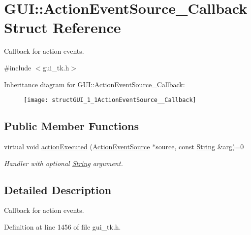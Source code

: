 \hypertarget{structGUI_1_1ActionEventSource__Callback}{\section{G\-U\-I\-:\-:Action\-Event\-Source\-\_\-\-Callback Struct Reference}
\label{structGUI_1_1ActionEventSource__Callback}
}


Callback for action events.  




{\ttfamily \#include $<$gui\-\_\-tk.\-h$>$}

Inheritance diagram for G\-U\-I\-:\-:Action\-Event\-Source\-\_\-\-Callback\-:\begin{figure}[H]
\begin{center}
\leavevmode
\texttt{[image: structGUI\_1\_1ActionEventSource\_\_Callback]}
\end{center}
\end{figure}
\subsection*{Public Member Functions}
\begin{DoxyCompactItemize}
\item 
virtual void \hyperlink{structGUI_1_1ActionEventSource__Callback_a36df23a424558a83b45e3e3d5c175cf2}{action\-Executed} (\hyperlink{classGUI_1_1ActionEventSource}{Action\-Event\-Source} $\ast$source, const \hyperlink{classGUI_1_1String}{String} \&arg)=0
\begin{DoxyCompactList}\small\item\em Handler with optional \hyperlink{classGUI_1_1String}{String} argument. \end{DoxyCompactList}\end{DoxyCompactItemize}


\subsection{Detailed Description}
Callback for action events. 

Definition at line 1456 of file gui\-\_\-tk.\-h.




